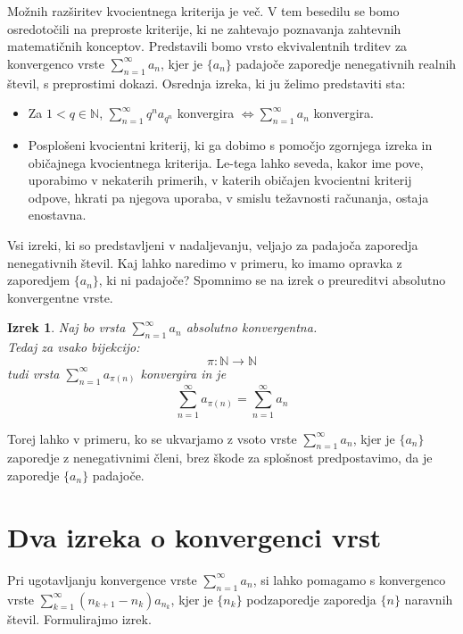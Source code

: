 \documentclass[a4paper,12pt]{article}
\def\N{\mathbb{N}} %
\newtheorem{izrek}{Izrek}
\begin{document}
Možnih razširitev kvocientnega kriterija je več. V tem besedilu se bomo osredotočili na preproste kriterije, ki ne
zahtevajo poznavanja zahtevnih matematičnih konceptov. Predstavili bomo vrsto ekvivalentnih trditev
za konvergenco vrste $\sum_{n = 1}^{\infty}{a_n}$, kjer je $\{a_n\}$ padajoče zaporedje nenegativnih realnih števil, s preprostimi dokazi. Osrednja
izreka, ki ju želimo predstaviti sta:

\begin{itemize}
    \item Za $ 1 < q \in \N$, $\sum_{n = 1}^{\infty}{q^na_{q^n}}$ konvergira $\iff \sum_{n = 1}^{\infty}{a_{n}}$ konvergira.
    \item Posplošeni kvocientni kriterij, ki ga dobimo s pomočjo zgornjega izreka in običajnega kvocientnega kriterija.
    Le-tega lahko seveda, kakor ime pove, uporabimo v nekaterih primerih, v katerih običajen kvocientni kriterij odpove, 
    hkrati pa njegova uporaba, v smislu težavnosti računanja, ostaja enostavna.
\end{itemize}


Vsi izreki, ki so predstavljeni v nadaljevanju, veljajo za padajoča zaporedja nenegativnih števil.
Kaj lahko naredimo v primeru, ko imamo opravka z zaporedjem $\{a_n\}$, ki ni padajoče?
Spomnimo se na izrek o preureditvi absolutno konvergentne vrste.

\begin{izrek}
    Naj bo vrsta $\sum_{n = 1}^{\infty}{a_n}$ absolutno konvergentna.\\
    Tedaj za vsako bijekcijo:
    \[\pi: \N \rightarrow \N \]
    tudi vrsta $\sum_{n = 1}^{\infty}{a_{\pi(n)}}$ konvergira in je 
    \[
        \sum_{n = 1}^{\infty}{a_{\pi(n)}} = \sum_{n = 1}^{\infty}{a_n}
    \]
\end{izrek}

Torej lahko v primeru, ko se ukvarjamo z vsoto vrste $\sum_{n = 1}^{\infty}{a_n}$, kjer je $\{a_n\}$ zaporedje z nenegativnimi členi, brez škode za splošnost predpostavimo, 
da je zaporedje $\{a_n\}$ padajoče. 

\section{Dva izreka o konvergenci vrst}
Pri ugotavljanju konvergence vrste $\sum_{n = 1}^{\infty}{a_n}$, si lahko pomagamo s konvergenco vrste
$\sum_{k = 1}^{\infty}{(n_{k+1} - n_k)a_{n_{k}}}$, kjer je $\{n_k\}$ podzaporedje zaporedja $\{n\}$ naravnih števil.
Formulirajmo izrek.
\end{document}
